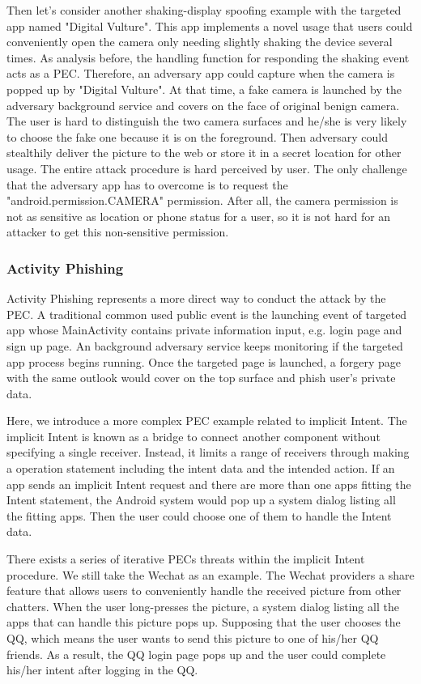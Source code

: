 \documentclass{sig-alternate-05-2015}
\begin{document}
Then let's consider another shaking-display spoofing example with the targeted app named "Digital Vulture". This app implements a novel usage that users could conveniently open the camera only needing slightly shaking the device several times. As analysis before, the handling function for responding the shaking event acts as a PEC. Therefore, an adversary app could capture when the camera is popped up by "Digital Vulture". At that time, a fake camera is launched by the adversary background service and covers on the face of original benign camera. The user is hard to distinguish the two camera surfaces and he/she is very likely to choose the fake one because it is on the foreground. Then adversary could stealthily deliver the picture to the web or store it in a secret location for other usage. The entire attack procedure is hard perceived by user. The only challenge that the adversary app has to overcome is to request the  "android.permission.CAMERA" permission. After all, the camera permission is not as sensitive as location or phone status for a user, so it is not hard for an attacker to get this non-sensitive permission.

\subsubsection{Activity Phishing}
Activity Phishing represents a more direct way to conduct the attack by the PEC. A traditional common used public event is the launching event of targeted app whose MainActivity contains private information input, e.g. login page and sign up page. An background adversary service keeps monitoring if the targeted app process begins running. Once the targeted page is launched, a forgery page with the same outlook would cover on the top surface and phish user's private data.

Here, we introduce a more complex PEC example related to implicit Intent. The implicit Intent is known as a bridge to connect another component without specifying a single receiver. Instead, it limits a range of receivers through making a operation statement including the intent data and the intended action. If an app sends an implicit Intent request and there are more than one apps fitting the Intent statement, the Android system would pop up a system dialog listing all the fitting apps. Then the user could choose one of them to handle the Intent data.

There exists a series of iterative PECs threats within the implicit Intent procedure. We still take the Wechat as an example. The Wechat providers a share feature that allows users to conveniently handle the received picture from other chatters. When the user long-presses the picture, a system dialog listing all the apps that can handle this picture pops up. Supposing that the user chooses the QQ, which means the user wants to send this picture to one of his/her QQ friends. As a result, the QQ login page pops up and the user could complete his/her intent after logging in the QQ.
\end{document}
